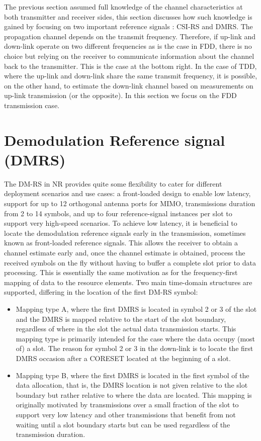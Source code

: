 The previous section assumed full knowledge of the channel characteristics at both transmitter and receiver sides, this section discusses how such knowledge is gained by focusing on two important reference signals : CSI-RS and DMRS.
\newline
The propagation channel depends on the transmit frequency. Therefore, if up-link and down-link operate on two different frequencies as is the case in FDD, there is no choice but relying on the receiver to communicate information about the channel back to the transmitter. This is the case at the bottom right.
\newline
In the case of TDD, where the up-link and down-link share the same transmit frequency, it is possible, on the other hand, to estimate the down-link channel based on measurements on up-link transmission (or the opposite). In this section we focus on the FDD transmission case.

\section{Demodulation Reference signal (DMRS)}
The DM-RS in NR provides quite some flexibility to cater for different deployment scenarios and use cases: a front-loaded design to enable low latency, support for up to 12 orthogonal antenna ports for MIMO, transmissions duration from 2 to 14 symbols, and up to four reference-signal instances per slot to support very high-speed scenarios.
To achieve low latency, it is beneficial to locate the demodulation reference signals early in the transmission, sometimes known as front-loaded reference signals. This allows the receiver to obtain a channel estimate early and, once the channel estimate is obtained, process the received symbols on the fly without having to buffer a complete slot prior to data processing. This is essentially the same motivation as for the frequency-first mapping of data to the resource elements.
Two main time-domain structures are supported, differing in the location of the first DM-RS symbol:
\begin{itemize}
    \item Mapping type A, where the first DMRS is located in symbol 2 or 3 of the slot and the DMRS is mapped relative to the start of the slot boundary, regardless of where in the slot the actual data transmission starts. This mapping type is primarily intended for the case where the data occupy (most of) a slot. The reason for symbol 2 or 3 in the down-link is to locate the first DMRS occasion after a CORESET located at the beginning of a slot.
    \item Mapping type B, where the first DMRS is located in the first symbol of the data allocation, that is, the DMRS location is not given relative to the slot boundary but rather relative to where the data are located. This mapping is originally motivated by transmissions over a small fraction of the slot to support very low latency and other transmissions that benefit from not waiting until a slot boundary starts but can be used regardless of the transmission duration.
\end{itemize}

